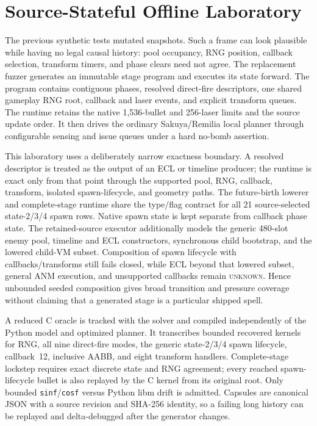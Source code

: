 \documentclass[10pt]{article}
\newcommand{\unknown}{\textsc{unknown}}
\newcommand{\code}[1]{\texttt{#1}}
\begin{document}
\section{Source-Stateful Offline Laboratory}

The previous synthetic tests mutated snapshots.  Such a frame can look
plausible while having no legal causal history: pool occupancy, RNG position,
callback selection, transform timers, and phase clears need not agree.  The
replacement fuzzer generates an immutable stage program and executes its
state forward.  The program contains contiguous phases, resolved direct-fire
descriptors, one shared gameplay RNG root, callback and laser events, and
explicit transform queues.  The runtime retains the native 1,536-bullet and
256-laser limits and the source update order.  It then drives the ordinary
Sakuya/Remilia local planner through configurable sensing and issue queues
under a hard no-bomb assertion.

This laboratory uses a deliberately narrow exactness boundary.  A resolved
descriptor is treated as the output of an ECL or timeline producer; the
runtime is exact only from that point through the supported pool, RNG,
callback, transform, isolated spawn-lifecycle, and geometry paths.  The
future-birth lowerer and complete-stage runtime share the type/flag contract
for all 21 source-selected state-2/3/4 spawn rows.  Native spawn state is kept
separate from callback phase state.  The retained-source executor additionally
models the generic 480-slot enemy pool, timeline and ECL constructors,
synchronous child bootstrap, and the lowered child-VM subset.  Composition of
spawn lifecycle with callbacks/transforms still fails closed, while ECL beyond
that lowered subset, general ANM execution, and unsupported callbacks remain
\unknown{}.  Hence unbounded seeded
composition gives broad transition and
pressure coverage without claiming that a generated stage is a particular
shipped spell.

A reduced C oracle is tracked with the solver and compiled independently of
the Python model and optimized planner.  It transcribes bounded recovered
kernels for RNG, all nine direct-fire modes, the generic state-2/3/4 spawn
lifecycle, callback~12, inclusive AABB, and eight transform handlers.
Complete-stage lockstep requires exact discrete
state and RNG agreement; every reached spawn-lifecycle bullet is also replayed
by the C kernel from its original root.  Only bounded
\code{sinf}/\code{cosf} versus Python libm drift is admitted.  Capsules are
canonical JSON with a source revision and SHA-256 identity, so a failing long
history can be replayed and delta-debugged after the generator changes.
\end{document}
